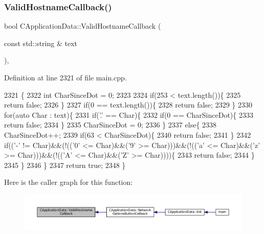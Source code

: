 \subsubsection{\texorpdfstring{Valid\+Hostname\+Callback()}{ValidHostnameCallback()}}
{\footnotesize\ttfamily bool C\+Application\+Data\+::\+Valid\+Hostname\+Callback (\begin{DoxyParamCaption}\item[{const std\+::string \&}]{text }\end{DoxyParamCaption})\hspace{0.3cm}{\ttfamily [static]}, {\ttfamily [protected]}}



Definition at line 2321 of file main.\+cpp.


\begin{DoxyCode}
2321                                                                  \{
2322     \textcolor{keywordtype}{int} CharSinceDot = 0;
2323 
2324     \textcolor{keywordflow}{if}(253 < text.length())\{
2325         \textcolor{keywordflow}{return} \textcolor{keyword}{false};    
2326     \}
2327     \textcolor{keywordflow}{if}(0 == text.length())\{
2328         \textcolor{keywordflow}{return} \textcolor{keyword}{false};
2329     \}
2330     \textcolor{keywordflow}{for}(\textcolor{keyword}{auto} Char : text)\{
2331         \textcolor{keywordflow}{if}(\textcolor{charliteral}{'.'} == Char)\{
2332             \textcolor{keywordflow}{if}(0 == CharSinceDot)\{
2333                 \textcolor{keywordflow}{return} \textcolor{keyword}{false};
2334             \}
2335             CharSinceDot = 0;
2336         \}
2337         \textcolor{keywordflow}{else}\{
2338             CharSinceDot++;
2339             \textcolor{keywordflow}{if}(63 < CharSinceDot)\{
2340                 \textcolor{keywordflow}{return} \textcolor{keyword}{false};   
2341             \}
2342             \textcolor{keywordflow}{if}((\textcolor{charliteral}{'-'} != Char)&&(!((\textcolor{charliteral}{'0'} <= Char)&&(\textcolor{charliteral}{'9'} >= Char)))&&(!((\textcolor{charliteral}{'a'} <= Char)&&(\textcolor{charliteral}{'z'} >= Char)))&&(!((\textcolor{charliteral}{'A'}
       <= Char)&&(\textcolor{charliteral}{'Z'} >= Char))))\{
2343                 \textcolor{keywordflow}{return} \textcolor{keyword}{false};
2344             \}
2345         \}
2346     \}
2347     \textcolor{keywordflow}{return} \textcolor{keyword}{true};
2348 \}
\end{DoxyCode}
Here is the caller graph for this function\+:\nopagebreak
\begin{figure}[H]
\begin{center}
\leavevmode
\includegraphics[width=350pt]{classCApplicationData_aad04c7da1cc86bef623efda1019907fd_icgraph}
\end{center}
\end{figure}
